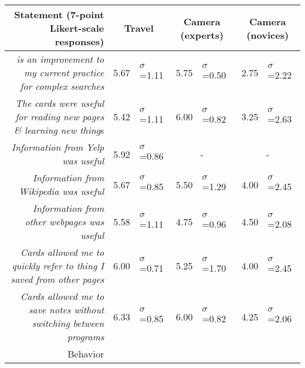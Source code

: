 \begin{table*}
  \centering
  \footnotesize
  \begin{tabular}{ r  r l   r l r l }
  
	
	\multicolumn{1}{p{1\columnwidth}}{Statement (7-point Likert-scale responses)} &
	\multicolumn{2}{c}{Travel} &
	\multicolumn{2}{c}{Camera (experts)} &
	\multicolumn{2}{c}{Camera (novices)} \\
    
	\hline
	
	
	\multicolumn{1}{p{1.0\columnwidth}}{\textit{\SYSTEM is an improvement to my current practice for complex searches}} & 
    5.67  & $\sigma$=1.11 &
    5.75 & $\sigma$=0.50 &
    2.75 & $\sigma$=2.22 \\
    
	\multicolumn{1}{p{1.0\columnwidth}}{\textit{The cards were useful for reading new pages \& learning new thing}s} &
    5.42 & $\sigma$=1.11 &
    6.00 & $\sigma$=0.82 &
    3.25 & $\sigma$=2.63 \\
    
	\multicolumn{1}{p{1.0\columnwidth}}{\textit{Information from Yelp was useful
}} &
    5.92 & $\sigma$=0.86 &
	\multicolumn{2}{c}{-} &
	\multicolumn{2}{c}{-} \\
    
	\multicolumn{1}{p{1.0\columnwidth}}{\textit{Information from Wikipedia was useful}} &
    5.67 & $\sigma$=0.85 &
    5.50 & $\sigma$=1.29 &
    4.00 & $\sigma$=2.45 \\
    
	\multicolumn{1}{p{1\columnwidth}}{\textit{Information from other webpages was useful}} &
    5.58 & $\sigma$=1.11 &
    4.75 & $\sigma$=0.96 &
    4.50 & $\sigma$=2.08 \\
    
    
	\multicolumn{1}{p{1.0\columnwidth}}{\textit{Cards allowed me to quickly refer to thing I saved from other pages}} &
    6.00 & $\sigma$=0.71 &
    5.25 & $\sigma$=1.70 &
    4.00 & $\sigma$=2.45 \\
    
	\multicolumn{1}{p{1.0\columnwidth}}{\textit{Cards allowed me to save notes without switching between programs}
} &
    6.33 & $\sigma$=0.85 &
    6.00 & $\sigma$=0.82 &
    4.25 & $\sigma$=2.06 \\
    
	\hline
	\multicolumn{1}{p{1\columnwidth}}{Behavior} &
	& &
	& &
	&\\
	\hline
    

\end{tabular}
\end{table*}

